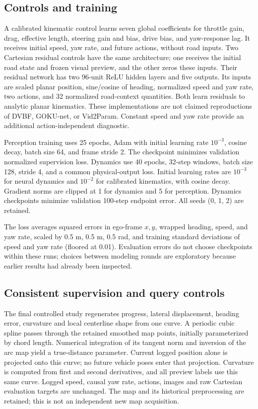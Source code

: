 \documentclass[preprint,12pt]{elsarticle}
\begin{document}
\subsection{Controls and training}\label{sec:baselines}
A calibrated kinematic control learns seven global coefficients for throttle
gain, drag, effective length, steering gain and bias, drive bias, and yaw-response
lag. It receives initial speed, yaw rate, and future actions, without road inputs.
Two Cartesian residual controls have the same architecture; one receives the
initial road state and frozen visual preview, and the other zeros these inputs.
Their residual network has two 96-unit ReLU hidden layers and five outputs.
Its inputs are scaled planar position, sine/cosine of heading, normalized speed
and yaw rate, two actions, and 32 normalized road-context quantities. Both learn
residuals to analytic planar kinematics. These implementations are
not claimed reproductions of DVBF, GOKU-net, or Vid2Param. Constant speed and yaw
rate provide an additional action-independent diagnostic.

Perception training uses 25 epochs, Adam with initial learning rate $10^{-3}$,
cosine decay, batch size 64, and frame stride 2. The checkpoint minimizes
validation normalized supervision loss. Dynamics use 40 epochs, 32-step windows,
batch size 128, stride 4, and a common physical-output loss. Initial learning
rates are $10^{-3}$ for neural dynamics and $10^{-2}$ for calibrated kinematics,
with cosine decay. Gradient norms are clipped at 1 for dynamics and 5 for
perception. Dynamics checkpoints minimize validation 100-step endpoint error.
All seeds (0, 1, 2) are retained.

The loss averages squared errors in ego-frame $x,y$, wrapped heading, speed,
and yaw rate, scaled by 0.5 m, 0.5 m, 0.5 rad, and training standard deviations
of speed and yaw rate (floored at 0.01). Evaluation errors do not choose
checkpoints within these runs; choices between modeling rounds are exploratory
because earlier results had already been inspected.

\subsection{Consistent supervision and query controls}\label{sec:corrected_method}
The final controlled study regenerates progress, lateral displacement, heading
error, curvature and local centerline shape from one curve. A periodic cubic
spline passes through the retained smoothed map points, initially parameterized
by chord length. Numerical integration of its tangent norm and inversion of the
arc map yield a true-distance parameter. Current logged position alone is
projected onto this curve; no future vehicle poses enter that projection.
Curvature is computed from first and second derivatives, and all preview labels
use this same curve. Logged speed, causal yaw rate, actions, images and raw
Cartesian evaluation targets are unchanged. The map and its historical
preprocessing are retained; this is not an independent new map acquisition.
\end{document}
